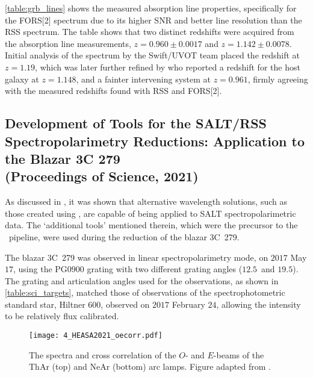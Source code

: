 

\autoref{table:grb_lines} shows the measured absorption line properties, specifically for the \gls{FORS}[2] spectrum due to its higher \gls{SNR} and better line resolution than the \gls{RSS} spectrum.
The table shows that two distinct redshifts were acquired from the absorption line measurements, $z = 0.960 \pm 0.0017$ and $z = 1.142 \pm 0.0078$.
Initial analysis of the spectrum by the \gls{Swift}/\gls{UVOT} team \citep{Kuin2019} placed the redshift at $z = 1.19$, which was later further refined by \citet{Vielfaure2019} who reported a redshift for the host galaxy at $z = 1.148$, and a fainter intervening system at $z = 0.961$, firmly agreeing with the measured redshifts found with \gls{RSS} and \gls{FORS}[2].

\subsection[Proceeding, HEASA (2021)]{%
    Development of Tools for the \gls{SALT}/\gls{RSS} Spectro\-polari\-metry Reductions: Application to the Blazar 3C 279\\
    (Proceedings of Science,  2021)
}

As discussed in \cite[][see also \autoref{app:papers}]{Cooper_HEASA2021}, it was shown that alternative wavelength solutions, such as those created using \iraf, are capable of being applied to \gls{SALT} spectro\-polarimetric data.
The `additional tools' mentioned therein, which were the precursor to the \stops\ pipeline, were used during the reduction of the blazar 3C~279.

The blazar 3C~279 was observed in linear spectropolarimetry mode, on $2017$ May $17$, using the PG$0900$ grating with two different grating angles ($12.5$\degree\ and $19.5$\degree).
The grating and articulation angles used for the observations, as shown in \autoref{table:sci_targets}, matched those of observations of the spectrophotometric standard star, Hiltner $600$, observed on $2017$ February $24$, allowing the intensity to be relatively flux calibrated.

\begin{figure}[t]
    \centering
    \texttt{[image: 4\_HEASA2021\_oecorr.pdf]}
    \caption{The spectra and cross correlation of the $O$- and $E$-beams of the \gls{ThAr} (top) and \gls{NeAr} (bottom) arc lamps. Figure adapted from \citep{Cooper_HEASA2021}.}
    \label{fig:HEASA2021_oecorr}
\end{figure}

